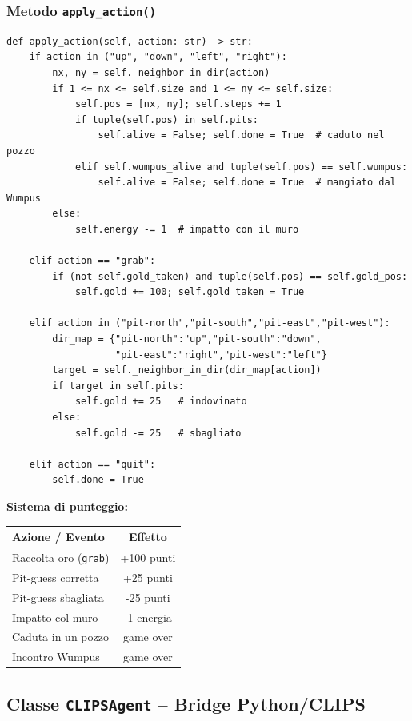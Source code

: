 \documentclass[12pt,a4paper]{article}
\begin{document}
\subsubsection{Metodo \texttt{apply\_action()}}

\begin{lstlisting}[language=Python3]
def apply_action(self, action: str) -> str:
    if action in ("up", "down", "left", "right"):
        nx, ny = self._neighbor_in_dir(action)
        if 1 <= nx <= self.size and 1 <= ny <= self.size:
            self.pos = [nx, ny]; self.steps += 1
            if tuple(self.pos) in self.pits:
                self.alive = False; self.done = True  # caduto nel pozzo
            elif self.wumpus_alive and tuple(self.pos) == self.wumpus:
                self.alive = False; self.done = True  # mangiato dal Wumpus
        else:
            self.energy -= 1  # impatto con il muro

    elif action == "grab":
        if (not self.gold_taken) and tuple(self.pos) == self.gold_pos:
            self.gold += 100; self.gold_taken = True

    elif action in ("pit-north","pit-south","pit-east","pit-west"):
        dir_map = {"pit-north":"up","pit-south":"down",
                   "pit-east":"right","pit-west":"left"}
        target = self._neighbor_in_dir(dir_map[action])
        if target in self.pits:
            self.gold += 25   # indovinato
        else:
            self.gold -= 25   # sbagliato

    elif action == "quit":
        self.done = True
\end{lstlisting}

\textbf{Sistema di punteggio:}
\begin{center}
\begin{tabular}{lc}
\toprule
\textbf{Azione / Evento} & \textbf{Effetto} \\
\midrule
Raccolta oro (\texttt{grab}) & +100 punti \\
Pit-guess corretta & +25 punti \\
Pit-guess sbagliata & -25 punti \\
Impatto col muro & -1 energia \\
Caduta in un pozzo & game over \\
Incontro Wumpus & game over \\
\bottomrule
\end{tabular}
\end{center}

\subsection{Classe \texttt{CLIPSAgent} -- Bridge Python/CLIPS}
\end{document}
